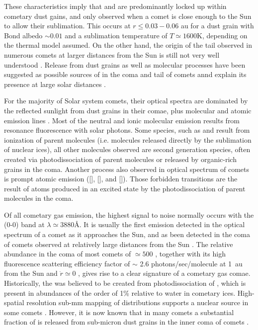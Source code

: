 \documentclass{aa}
\begin{document}
These characteristics imply that  and  are predominantly locked up within cometary dust gains, and only observed when a comet is close enough to the Sun to allow their sublimation.
%
This occurs at $r\leq 0.03-0.06$ au for a dust grain with Bond albedo $\sim0.01$ and a sublimation temperature of $T\simeq 1600$K, depending on the thermal model assumed.
%
On the other hand, the origin of the  tail observed in numerous comets at larger distances from the Sun is still not very well understood \citep{Cremonese02}.
%
Release from dust grains as well as molecular processes have been suggested as possible sources of  in the coma and tail of comets annd explain its presence at large solar distances \citep{Cremonese1997}.

For the majority of Solar system comets, their optical spectra are dominated by the reflected sunlight from dust grains in their comae, plus molecular and atomic emission lines \citep[e.g. ][]{hyland2019}.
%
Most of the neutral and ionic molecular emission results from resonance fluorescence with solar photons. Some species, such as  and  result from ionization of parent molecules (i.e. molecules released directly by the sublimation of nuclear ices), all other molecules observed are second generation species, often created via photodissociation of parent molecules or released by organic-rich grains in the coma.
%
Another process also observed in optical spectrum of comets is prompt atomic emission  ([], [], and []).
%
Those forbidden transitions are the result of atoms produced in an excited state by the photodissociation of parent molecules in the coma. 

Of all cometary gas emission, the highest signal to noise normally occurs with the  (0-0) band at $\lambda\simeq 3880$\AA.
%
It is usually the first emission detected in the optical spectrum of a comet as it approaches the Sun, and as been detected in the coma of comets observed at relatively large distances from the Sun \citep[e.g. ][]{Fitzsimmons1996}.
%
The relative abundance in the coma of most comets of $\simeq500$ \citep{AHearn1995}, together with its high fluorescence scattering efficiency factor of $\sim$ 2.6 photons/sec/molecule at 1~au from the Sun and $\dot{r}\simeq 0$ \citep{Schleicher2010}, gives rise to a clear signature of a cometary gas comae.
%
Historically, the  was believed to be created from photodissociation of , which is present in abundances of the order of 1\% relative to water in cometary ices.
%
High-spatial resolution sub-mm mapping of  distributions supports a nuclear source in some comets \citep{Cordiner2014}.
%
However, it is now known that in many comets a substantial fraction of  is released from sub-micron dust grains in the inner coma of comets \citep[e.g. ][]{Fray2005}. 
\end{document}
